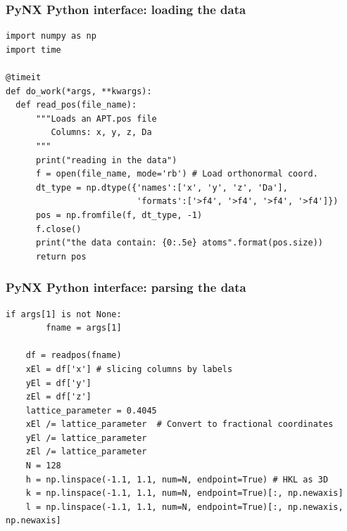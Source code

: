 \documentclass[]{beamer}
\begin{document}
\begin{frame}[fragile]
\frametitle{PyNX \textbf{Python interface}: loading the data}
\begin{lstlisting}
import numpy as np
import time 

@timeit
def do_work(*args, **kwargs):     
  def read_pos(file_name):
      """Loads an APT.pos file 
         Columns: x, y, z, Da
      """
      print("reading in the data")
      f = open(file_name, mode='rb') # Load orthonormal coord.
      dt_type = np.dtype({'names':['x', 'y', 'z', 'Da'],
                          'formats':['>f4', '>f4', '>f4', '>f4']})
      pos = np.fromfile(f, dt_type, -1)
      f.close()
      print("the data contain: {0:.5e} atoms".format(pos.size))
      return pos
\end{lstlisting}
\end{frame}


\begin{frame}[containsverbatim]
\frametitle{PyNX Python interface: parsing the data}
    \begin{lstlisting}[firstnumber=16]
    if args[1] is not None:
        fname = args[1]

    df = readpos(fname)	
    xEl = df['x'] # slicing columns by labels
    yEl = df['y']
    zEl = df['z']
    lattice_parameter = 0.4045
    xEl /= lattice_parameter  # Convert to fractional coordinates
    yEl /= lattice_parameter 
    zEl /= lattice_parameter 
    N = 128
    h = np.linspace(-1.1, 1.1, num=N, endpoint=True) # HKL as 3D
    k = np.linspace(-1.1, 1.1, num=N, endpoint=True)[:, np.newaxis]
    l = np.linspace(-1.1, 1.1, num=N, endpoint=True)[:, np.newaxis, np.newaxis]
     \end{lstlisting}
\end{frame}

\end{document}
